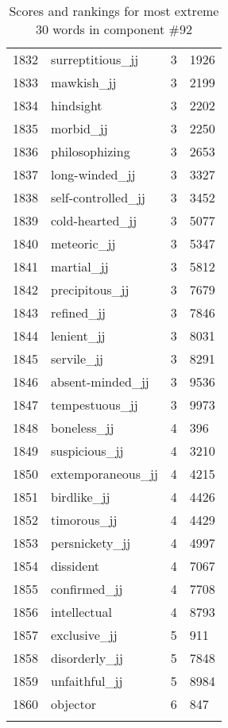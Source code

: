 \begin{longtable}[!htbp]{| rlr@{.}l |}
    1832 & surreptitious\_jj & 3 & 1926 \\
    1833 & mawkish\_jj & 3 & 2199 \\
    1834 & hindsight & 3 & 2202 \\
    1835 & morbid\_jj & 3 & 2250 \\
    1836 & philosophizing & 3 & 2653 \\
    1837 & long-winded\_jj & 3 & 3327 \\
    1838 & self-controlled\_jj & 3 & 3452 \\
    1839 & cold-hearted\_jj & 3 & 5077 \\
    1840 & meteoric\_jj & 3 & 5347 \\
    1841 & martial\_jj & 3 & 5812 \\
    1842 & precipitous\_jj & 3 & 7679 \\
    1843 & refined\_jj & 3 & 7846 \\
    1844 & lenient\_jj & 3 & 8031 \\
    1845 & servile\_jj & 3 & 8291 \\
    1846 & absent-minded\_jj & 3 & 9536 \\
    1847 & tempestuous\_jj & 3 & 9973 \\
    1848 & boneless\_jj & 4 & 396 \\
    1849 & suspicious\_jj & 4 & 3210 \\
    1850 & extemporaneous\_jj & 4 & 4215 \\
    1851 & birdlike\_jj & 4 & 4426 \\
    1852 & timorous\_jj & 4 & 4429 \\
    1853 & persnickety\_jj & 4 & 4997 \\
    1854 & dissident & 4 & 7067 \\
    1855 & confirmed\_jj & 4 & 7708 \\
    1856 & intellectual & 4 & 8793 \\
    1857 & exclusive\_jj & 5 & 911 \\
    1858 & disorderly\_jj & 5 & 7848 \\
    1859 & unfaithful\_jj & 5 & 8984 \\
    1860 & objector & 6 & 847 \\
    \hline
    \caption{Scores and rankings for most extreme 30 words in component \#92} \\
\end{longtable}
